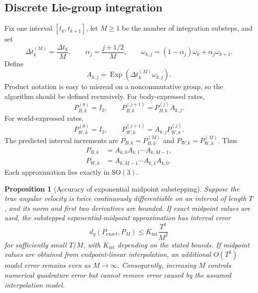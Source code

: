 \documentclass[11pt]{article}
\newtheorem{proposition}[theorem]{Proposition}
\newcommand{\SO}{\mathrm{SO}(3)}
\newcommand{\I}{I_3}
\newcommand{\Exp}{\operatorname{Exp}}
\begin{document}
    \subsection{Discrete Lie-group integration}

    Fix one interval $[t_k,t_{k+1}]$, let $M\ge1$ be the number of integration substeps,
    and set
    \begin{equation}
        \Delta t_k^{(M)}=\frac{\Delta t_k}{M},
        \qquad
        \alpha_j=\frac{j+1/2}{M},
        \qquad
        \omega_{k,j}=(1-\alpha_j)\omega_k+\alpha_j\omega_{k+1}.
    \end{equation}
    Define
    \begin{equation}
        A_{k,j}=\Exp\!\left(\Delta t_k^{(M)}\omega_{k,j}\right).
    \end{equation}
    Product notation is easy to misread on a noncommutative group, so the algorithm should
    be defined recursively. For body-expressed rates,
    \begin{equation}
        P_{B,k}^{(0)}=\I,
        \qquad
        P_{B,k}^{(j+1)}=P_{B,k}^{(j)}A_{k,j}.
    \end{equation}
    For world-expressed rates,
    \begin{equation}
        P_{W,k}^{(0)}=\I,
        \qquad
        P_{W,k}^{(j+1)}=A_{k,j}P_{W,k}^{(j)}.
    \end{equation}
    The predicted interval increments are $P_{B,k}=P_{B,k}^{(M)}$ and
    $P_{W,k}=P_{W,k}^{(M)}$. Thus
    \begin{align}
        P_{B,k}&=A_{k,0}A_{k,1}\cdots A_{k,M-1}, \\
        P_{W,k}&=A_{k,M-1}\cdots A_{k,1}A_{k,0}.
    \end{align}
    Each approximation lies exactly in $\SO$.

    \begin{proposition}[Accuracy of exponential midpoint substepping]\label{prop:midpoint-accuracy}
        Suppose the true angular velocity is twice continuously differentiable on an interval of
        length $T$, and its norm and first two derivatives are bounded. If exact midpoint values
        are used, the substepped exponential-midpoint approximation has interval error
        \begin{equation}
            d_g(P_{\mathrm{exact}},P_M)\le K_{\mathrm{int}}\frac{T^3}{M^2}
        \end{equation}
        for sufficiently small $T/M$, with $K_{\mathrm{int}}$ depending on the stated bounds. If midpoint
        values are obtained from endpoint-linear interpolation, an additional $O(T^3)$ model
        error remains even as $M\to\infty$. Consequently, increasing $M$ controls numerical
        quadrature error but cannot remove error caused by the assumed interpolation model.
    \end{proposition}
\end{document}
